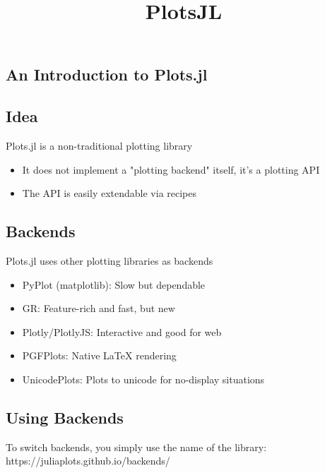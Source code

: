 \documentclass[11pt]{article}
\title{PlotsJL}
\providecommand{\tightlist}{%
      \setlength{\itemsep}{0pt}\setlength{\parskip}{0pt}}
\begin{document}
    
    
    \maketitle
    
    

    
    \subsection{An Introduction to
Plots.jl}\label{an-introduction-to-plots.jl}

    \subsection{Idea}\label{idea}

Plots.jl is a non-traditional plotting library

\begin{itemize}
\tightlist
\item
  It does not implement a "plotting backend" itself, it's a plotting API
\item
  The API is easily extendable via recipes
\end{itemize}

    \subsection{Backends}\label{backends}

Plots.jl uses other plotting libraries as backends

\begin{itemize}
\tightlist
\item
  PyPlot (matplotlib): Slow but dependable
\item
  GR: Feature-rich and fast, but new
\item
  Plotly/PlotlyJS: Interactive and good for web
\item
  PGFPlots: Native LaTeX rendering
\item
  UnicodePlots: Plots to unicode for no-display situations
\end{itemize}

    \subsection{Using Backends}\label{using-backends}

To switch backends, you simply use the name of the library:
https://juliaplots.github.io/backends/
\end{document}
